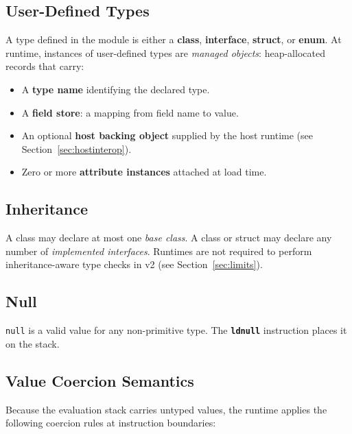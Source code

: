 \documentclass[11pt,a4paper]{article}
\newcommand{\opcode}[1]{\textbf{\texttt{#1}}}
\begin{document}
\subsection{User-Defined Types}

A type defined in the module is either a \textbf{class}, \textbf{interface},
\textbf{struct}, or \textbf{enum}. At runtime, instances of user-defined
types are \emph{managed objects}: heap-allocated records that carry:

\begin{itemize}[leftmargin=1.8em]
  \item A \textbf{type name} identifying the declared type.
  \item A \textbf{field store}: a mapping from field name to value.
  \item An optional \textbf{host backing object} supplied by the host runtime
    (see Section~\ref{sec:hostinterop}).
  \item Zero or more \textbf{attribute instances} attached at load time.
\end{itemize}

\subsection{Inheritance}

A class may declare at most one \emph{base class}. A class or struct may
declare any number of \emph{implemented interfaces}. Runtimes are not
required to perform inheritance-aware type checks in v2
(see Section~\ref{sec:limits}).

\subsection{Null}

\texttt{null} is a valid value for any non-primitive type. The
\opcode{ldnull} instruction places it on the stack.

\subsection{Value Coercion Semantics}
\label{sec:coerce}

Because the evaluation stack carries untyped values, the runtime applies
the following coercion rules at instruction boundaries:
\end{document}
